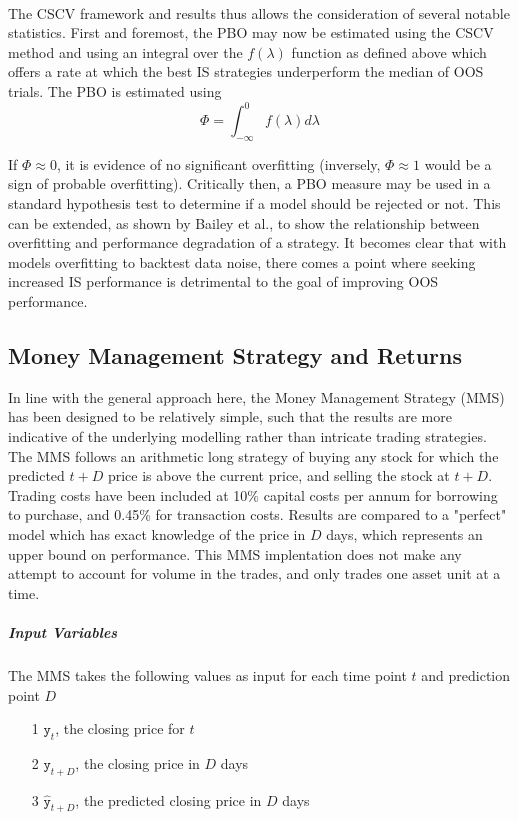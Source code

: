 \documentclass[a4paper,11pt,oneside]{article}
\theoremstyle{plain}
\theoremstyle{definition}
\begin{document}
\texttt{\\}
\newline The CSCV framework and results thus allows the consideration of several notable statistics. First and foremost, 
the PBO may now be estimated using the CSCV method and using an integral over the $f(\lambda)$ function 
as defined above which offers a rate at which the best IS strategies underperform the median of OOS trials. The PBO is estimated using
\begin{equation}
\Phi = \int_{-\infty}^{0} f (\lambda) d \lambda
\end{equation}


If $\Phi \approx 0$,
it is evidence of no significant overfitting (inversely, $\Phi \approx 1$ would be a sign of probable overfitting). Critically then, a PBO measure may be used in a standard hypothesis test to determine if a model should be rejected or not. This 
can be extended, as shown by Bailey et al., to show the relationship between overfitting and performance 
degradation of a strategy. It becomes clear that with models overfitting to backtest data noise, there comes a point 
where seeking increased IS performance is detrimental to the goal of improving OOS performance.  
\hfill \break 


\subsection{Money Management Strategy and Returns}\label{imp_mms}

In line with the general approach here, the Money Management Strategy (MMS) has been designed to be relatively simple, such that the results are more indicative of the underlying modelling rather than intricate trading strategies. The MMS follows an arithmetic long strategy of buying any stock for which the predicted ${t+D}$ price is above the current price, and selling the stock at ${t+D}$. Trading costs have been included at 10\% capital costs per annum for borrowing to purchase, and 0.45\% for transaction costs. Results are compared to a "perfect" model which has exact knowledge of the price in $D$ days, which represents an upper bound on performance. This MMS implentation does not make any attempt to account for volume in the trades, and only trades one asset unit at a time.
\hfill\break

\subparagraph{Input Variables}

The MMS takes the following values as input for each time point $t$  and prediction point $D$
\begin{itemize}
	\item [1] {$\texttt{y}_t$}, the closing price for $t$
	\item [2] $\texttt{y}_{t+D}$, the closing price in $D$ days
	\item [3] $\hat{\texttt{y}}_{t+D}$, the predicted closing price in $D$ days
\end{itemize}
\end{document}
